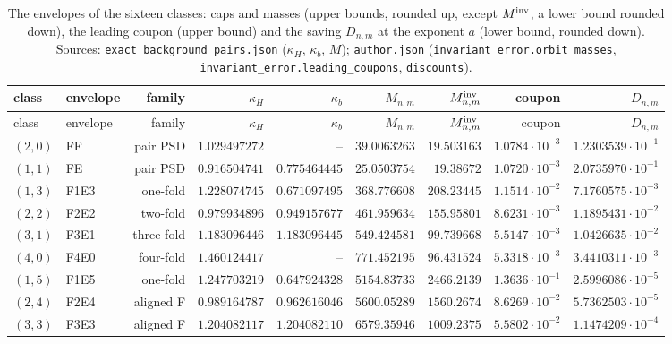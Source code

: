 {\scriptsize\setlength{\tabcolsep}{3pt}\renewcommand{\arraystretch}{0.92}
\begin{longtable}{@{}llrrrrrrr@{}}
\caption{The envelopes of the sixteen classes: caps and masses (upper bounds, rounded up, except $M^{\rm inv}$, a lower bound rounded down), the leading coupon (upper bound) and the saving $D_{n,m}$ at the exponent $a$ (lower bound, rounded down). Sources: \texttt{exact\_background\_pairs.json} ($\kappa_H$, $\kappa_b$, $M$); \texttt{author.json} (\texttt{invariant\_error.orbit\_masses}, \texttt{invariant\_error.leading\_coupons}, \texttt{discounts}).}\label{tab:data:envelopes}\\
\toprule
class & envelope & family & $\kappa_H$ & $\kappa_b$ & $M_{n,m}$ & $M^{\rm inv}_{n,m}$ & coupon & $D_{n,m}$\\
\midrule
\endfirsthead
\toprule
class & envelope & family & $\kappa_H$ & $\kappa_b$ & $M_{n,m}$ & $M^{\rm inv}_{n,m}$ & coupon & $D_{n,m}$\\
\midrule
\endhead
\bottomrule
\endfoot
$(2,0)$ & FF & pair PSD & $1.029497272$ & -- & $39.0063263$ & $19.503163$ & $1.0784\cdot10^{-3}$ & $1.2303539\cdot10^{-1}$\\
$(1,1)$ & FE & pair PSD & $0.916504741$ & $0.775464445$ & $25.0503754$ & $19.38672$ & $1.0720\cdot10^{-3}$ & $2.0735970\cdot10^{-1}$\\
$(1,3)$ & F1E3 & one-fold & $1.228074745$ & $0.671097495$ & $368.776608$ & $208.23445$ & $1.1514\cdot10^{-2}$ & $7.1760575\cdot10^{-3}$\\
$(2,2)$ & F2E2 & two-fold & $0.979934896$ & $0.949157677$ & $461.959634$ & $155.95801$ & $8.6231\cdot10^{-3}$ & $1.1895431\cdot10^{-2}$\\
$(3,1)$ & F3E1 & three-fold & $1.183096446$ & $1.183096445$ & $549.424581$ & $99.739668$ & $5.5147\cdot10^{-3}$ & $1.0426635\cdot10^{-2}$\\
$(4,0)$ & F4E0 & four-fold & $1.460124417$ & -- & $771.452195$ & $96.431524$ & $5.3318\cdot10^{-3}$ & $3.4410311\cdot10^{-3}$\\
$(1,5)$ & F1E5 & one-fold & $1.247703219$ & $0.647924328$ & $5154.83733$ & $2466.2139$ & $1.3636\cdot10^{-1}$ & $2.5996086\cdot10^{-5}$\\
$(2,4)$ & F2E4 & aligned F & $0.989164787$ & $0.962616046$ & $5600.05289$ & $1560.2674$ & $8.6269\cdot10^{-2}$ & $5.7362503\cdot10^{-5}$\\
$(3,3)$ & F3E3 & aligned F & $1.204082117$ & $1.204082110$ & $6579.35946$ & $1009.2375$ & $5.5802\cdot10^{-2}$ & $1.1474209\cdot10^{-4}$\\

\end{longtable}}
